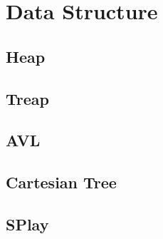 \section{Data Structure}

\subsection{Heap}


\subsection{Treap}


\subsection{AVL}


\subsection{Cartesian Tree}


\subsection{SPlay}




